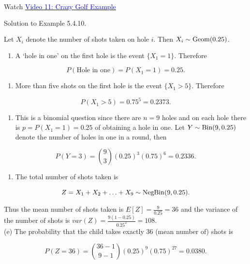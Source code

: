 \documentclass[
]{book}
\providecommand{\tightlist}{%
  \setlength{\itemsep}{0pt}\setlength{\parskip}{0pt}}
\begin{document}
Watch \href{https://mediaspace.nottingham.ac.uk/media/Crazy+Golf+FINAL+VERSION/1_n6lfsnjm}{\textcolor{blue}{Video 11: Crazy Golf Example}}

Solution to Example 5.4.10.

Let \(X_i\) denote the number of shots taken on hole \(i\). Then \(X_i \sim {\rm Geom} (0.25)\).

\begin{enumerate}
\def\labelenumi{(\alph{enumi})}
\tightlist
\item
  A `hole in one' on the first hole is the event \(\{ X_1 =1\}\). Therefore
\end{enumerate}

\[ P(\mbox{Hole in one}) = P(X_1 =1) =0.25. \]

\begin{enumerate}
\def\labelenumi{(\alph{enumi})}
\setcounter{enumi}{1}
\tightlist
\item
  More than five shots on the first hole is the event \(\{X_1 >5\}\). Therefore
\end{enumerate}

\[ P(X_1 >5) =0.75^5 = 0.2373. \]

\begin{enumerate}
\def\labelenumi{(\alph{enumi})}
\setcounter{enumi}{2}
\tightlist
\item
  This is a binomial question since there are \(n=9\) holes and on each hole there is \(p=P(X_1 =1) =0.25\) of obtaining a hole in one. Let \(Y \sim {\rm Bin} (9,0.25)\) denote the number of holes in one in a round, then
\end{enumerate}

\[ P(Y=3) = \binom{9}{3} (0.25)^3 (0.75)^6 =0.2336. \]

\begin{enumerate}
\def\labelenumi{(\alph{enumi})}
\setcounter{enumi}{3}
\tightlist
\item
  The total number of shots taken is
\end{enumerate}

\[Z = X_1 + X_2 + \ldots +X_9 \sim {\rm Neg Bin} (9,0.25). \]

Thus the mean number of shots taken is \(E[Z] = \frac{9}{0.25} = 36\) and the variance of the number of shots is \(var (Z) = \frac{9 (1-0.25)}{0.25^2} =108\).\\
(e) The probability that the child takes exactly 36 (mean number of) shots is

\[ P(Z=36) = \binom{36-1}{9-1} (0.25)^9 (0.75)^{27} = 0.0380. \]
\end{document}
